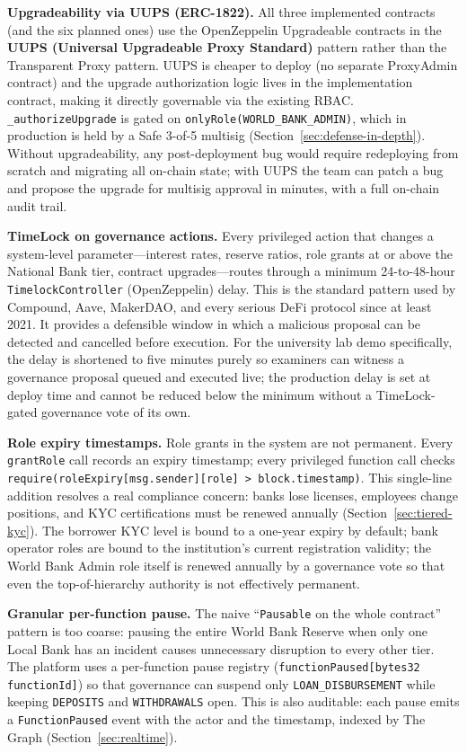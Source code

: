\documentclass[12pt,a4paper]{report}
\begin{document}
\textbf{Upgradeability via UUPS (ERC-1822).} All three implemented contracts (and the six planned ones) use the OpenZeppelin Upgradeable contracts in the \textbf{UUPS (Universal Upgradeable Proxy Standard)} pattern rather than the Transparent Proxy pattern. UUPS is cheaper to deploy (no separate ProxyAdmin contract) and the upgrade authorization logic lives in the implementation contract, making it directly governable via the existing RBAC. \texttt{\_authorizeUpgrade} is gated on \texttt{onlyRole(WORLD\_BANK\_ADMIN)}, which in production is held by a Safe 3-of-5 multisig (Section~\ref{sec:defense-in-depth}). Without upgradeability, any post-deployment bug would require redeploying from scratch and migrating all on-chain state; with UUPS the team can patch a bug and propose the upgrade for multisig approval in minutes, with a full on-chain audit trail.

\textbf{TimeLock on governance actions.} Every privileged action that changes a system-level parameter---interest rates, reserve ratios, role grants at or above the National Bank tier, contract upgrades---routes through a minimum 24-to-48-hour \texttt{TimelockController} (OpenZeppelin) delay. This is the standard pattern used by Compound, Aave, MakerDAO, and every serious DeFi protocol since at least 2021. It provides a defensible window in which a malicious proposal can be detected and cancelled before execution. For the university lab demo specifically, the delay is shortened to five minutes purely so examiners can witness a governance proposal queued and executed live; the production delay is set at deploy time and cannot be reduced below the minimum without a TimeLock-gated governance vote of its own.

\textbf{Role expiry timestamps.} Role grants in the system are not permanent. Every \texttt{grantRole} call records an expiry timestamp; every privileged function call checks \texttt{require(roleExpiry[msg.sender][role] > block.timestamp)}. This single-line addition resolves a real compliance concern: banks lose licenses, employees change positions, and KYC certifications must be renewed annually (Section~\ref{sec:tiered-kyc}). The borrower KYC level is bound to a one-year expiry by default; bank operator roles are bound to the institution's current registration validity; the World Bank Admin role itself is renewed annually by a governance vote so that even the top-of-hierarchy authority is not effectively permanent.

\textbf{Granular per-function pause.} The naive ``\texttt{Pausable} on the whole contract'' pattern is too coarse: pausing the entire World Bank Reserve when only one Local Bank has an incident causes unnecessary disruption to every other tier. The platform uses a per-function pause registry (\texttt{functionPaused[bytes32 functionId]}) so that governance can suspend only \texttt{LOAN\_DISBURSEMENT} while keeping \texttt{DEPOSITS} and \texttt{WITHDRAWALS} open. This is also auditable: each pause emits a \texttt{FunctionPaused} event with the actor and the timestamp, indexed by The Graph (Section~\ref{sec:realtime}).
\end{document}
